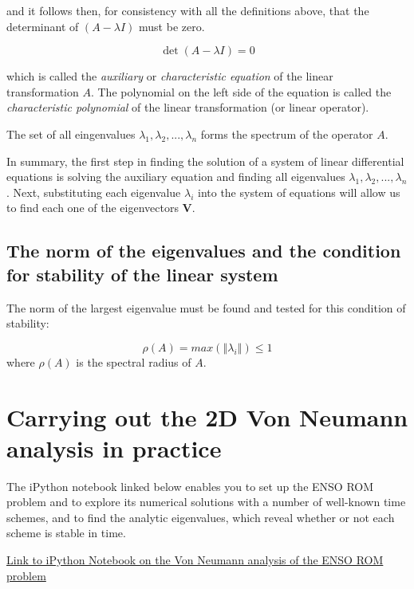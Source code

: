 and it follows then, for consistency with all the definitions above, that the determinant of $(A - \lambda I)$ must be zero.

\begin{equation}
\det{(A - \lambda I)} = 0
\end{equation}

which is called the \emph{auxiliary} or \emph{characteristic equation} of the linear transformation $A$. The polynomial on the left side of the equation is called the  \emph{characteristic polynomial} of the linear transformation (or linear operator). 

The set of all eingenvalues $\lambda_1, \lambda_2, ... , \lambda_n$ forms the spectrum of the operator $A$.

In summary, the first step in finding the solution of a system of linear differential equations is solving the
auxiliary equation and finding all eigenvalues $\lambda_1, \lambda_2, ... , \lambda_n$. Next, substituting each eigenvalue $\lambda_i$ into the system of equations will allow us to find each one of the eigenvectors $\mathbf{V}$.

\subsection{The norm of the eigenvalues and the condition for stability of the linear system}
The norm of the largest eigenvalue must be found and tested for this condition of stability:

\begin{equation}
	\rho(A) = max( \left\Vert \lambda_i \right\Vert ) \le 1
\end{equation}
where $\rho(A) $ is the spectral radius of $A$.

\section{Carrying out the 2D Von Neumann analysis in practice}
The iPython notebook linked below enables you to set up the ENSO ROM problem and to explore its numerical solutions with a number of well-known time schemes, and to find the analytic eigenvalues, which reveal whether or not each scheme is stable in time.
 
	\href{https://github.com/pierluigividale/MTMW14/blob/main/Notebooks/Euler\_stability\_SymPy\_2025\_HaltinerWilliams.ipynb}{Link to iPython Notebook on the Von Neumann analysis of the ENSO ROM problem}

\vspace{1em} 


